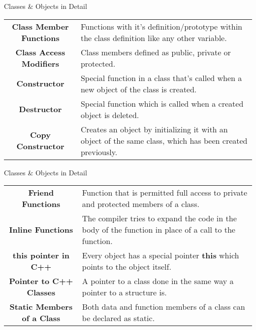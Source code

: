 \documentclass[../lecture5-objectorientation.tex]{subfiles}
\begin{document}
\begin{frame}[fragile]{Classes \& Objects in Detail}
    \begin{table}[h]
        \center
        \begin{tabularx}{\textwidth}{c X}
            \textbf{Class Member Functions} & Functions with it's definition/prototype within the class definition like any other variable. \\[0.5cm]
            \textbf{Class Access Modifiers} & Class members defined as public, private or protected. \\[0.5cm]
            \textbf{Constructor} & Special function in a class that's called when a new object of the class is created. \\[0.5cm]
            \textbf{Destructor} & Special function which is called when a created object is deleted. \\[0.5cm]
            \textbf{Copy Constructor} & Creates an object by initializing it with an object of the same class, which has been created previously. \\
        \end{tabularx}
    \end{table}
\end{frame}

\begin{frame}[fragile]{Classes \& Objects in Detail}
    \begin{table}[h]
        \center
        \begin{tabularx}{\textwidth}{c X}
            \textbf{Friend Functions} & Function that is permitted full access to private and protected members of a class. \\[0.5cm]
            \textbf{Inline Functions} & The compiler tries to expand the code in the body of the function in place of a call to the function. \\[0.5cm]
            \textbf{this pointer in C++} & Every object has a special pointer \textbf{this} which points to the object itself. \\[0.5cm]
            \textbf{Pointer to C++ Classes} & A pointer to a class done in the same way a pointer to a structure is. \\[0.5cm]
            \textbf{Static Members of a Class} & Both data and function members of a class can be declared as static. \\
        \end{tabularx}
    \end{table}
\end{frame}

\end{document}

